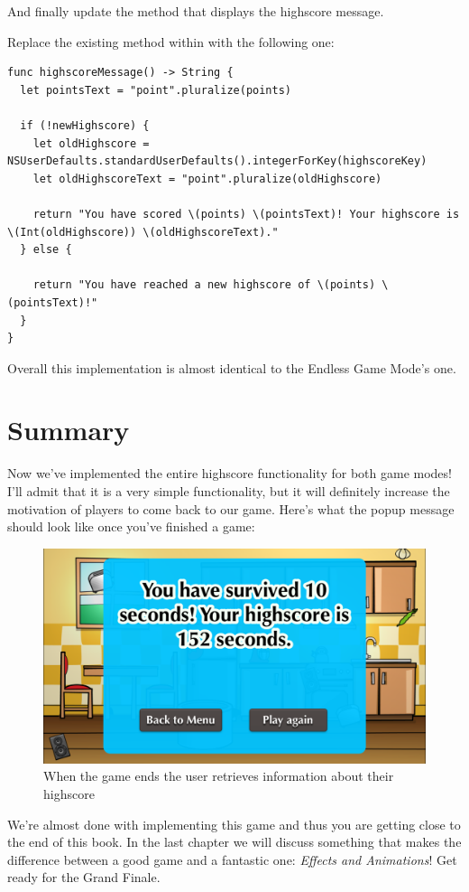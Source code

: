 And finally update the method that displays the highscore message.
\begin{leftbar}
Replace the existing  method within
 with the following one:
\begin{lstlisting}
func highscoreMessage() -> String {
  let pointsText = "point".pluralize(points)
  
  if (!newHighscore) {
    let oldHighscore = NSUserDefaults.standardUserDefaults().integerForKey(highscoreKey)
    let oldHighscoreText = "point".pluralize(oldHighscore)
    
    return "You have scored \(points) \(pointsText)! Your highscore is \(Int(oldHighscore)) \(oldHighscoreText)."
  } else {
    
    return "You have reached a new highscore of \(points) \(pointsText)!"
  }
}
\end{lstlisting}
\end{leftbar}
Overall this implementation is almost identical to the Endless Game Mode's one.

\section{Summary}
Now we've implemented the entire highscore functionality for both game modes!
I'll admit that it is a very simple functionality, but it will definitely
increase the motivation of players to come back to our game. Here's what the
popup message should look like once you've finished a game:

\begin{figure}[H]
    \centering
    \includegraphics[width=0.6\linewidth]{images/Chapter8/Highscore_Message.png}
    \caption{When the game ends the user retrieves information about their
    highscore}
\end{figure}

We're almost done with implementing this game and thus you are getting close to
the end of this book. In the last chapter we will discuss something that makes
the difference between a good game and a fantastic one: \textit{Effects and
Animations}! Get ready for the Grand Finale.
